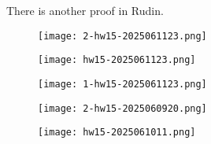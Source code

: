 \begin{note}
There is another proof in Rudin.
\end{note}
\begin{figure}[H]
\centering
\texttt{[image: 2-hw15-2025061123.png]}
\label{}
\end{figure}
\begin{figure}[H]
\centering
\texttt{[image: hw15-2025061123.png]}
\label{}
\end{figure}
\begin{figure}[H]
\centering
\texttt{[image: 1-hw15-2025061123.png]}
\label{}
\end{figure}

\begin{exercise}
\begin{figure}[H]
\centering
\texttt{[image: 2-hw15-2025060920.png]}
\label{}
\end{figure}
\end{exercise}
\begin{figure}[H]
\centering
\texttt{[image: hw15-2025061011.png]}
\label{}
\end{figure}
